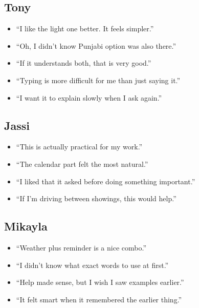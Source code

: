 \documentclass[12pt, titlepage]{article}
\begin{document}
\subsection{Tony}

\begin{itemize}
    \item ``I like the light one better. It feels simpler.''
    \item ``Oh, I didn't know Punjabi option was also there.''
    \item ``If it understands both, that is very good.''
    \item ``Typing is more difficult for me than just saying it.''
    \item ``I want it to explain slowly when I ask again.''
\end{itemize}

\subsection{Jassi}

\begin{itemize}
    \item ``This is actually practical for my work.''
    \item ``The calendar part felt the most natural.''
    \item ``I liked that it asked before doing something important.''
    \item ``If I'm driving between showings, this would help.''
\end{itemize}

\subsection{Mikayla}

\begin{itemize}
    \item ``Weather plus reminder is a nice combo.''
    \item ``I didn't know what exact words to use at first.''
    \item ``Help made sense, but I wish I saw examples earlier.''
    \item ``It felt smart when it remembered the earlier thing.''
\end{itemize}
\end{document}
